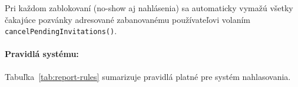   Pri každom zablokovaní (no-show aj nahlásenia) sa automaticky vymažú všetky
  čakajúce pozvánky adresované zabanovanému používateľovi volaním
  \texttt{cancelPendingInvitations()}.

  \paragraph{Pravidlá systému:}
  Tabuľka~\ref{tab:report-rules} sumarizuje pravidlá platné pre systém
  nahlasovania.

